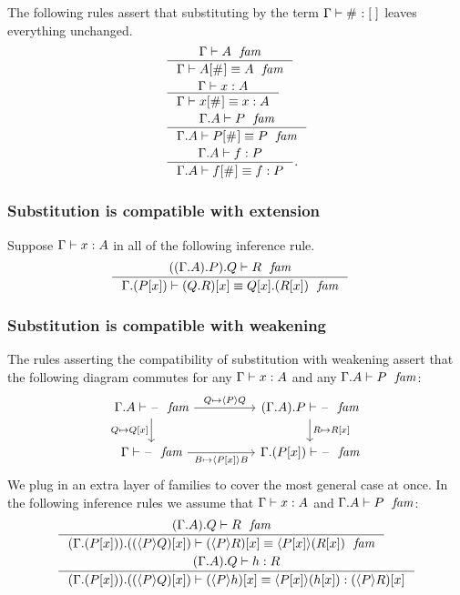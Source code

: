 The following rules assert that substituting by the term $\jterm{\Gamma}{\emptyf}{\emptytm}$
leaves everything unchanged.
\begin{align}
& \inference
  {\jfam{\Gamma}{A}}
  {\jfameq{\Gamma}{\subst{\emptytm}{A}}{A}}\\
& \inference
  {\jterm{\Gamma}{A}{x}}
  {\jtermeq{\Gamma}{A}{\subst{\emptytm}{x}}{x}}\\
& \inference
  {\jfam{{\Gamma}{A}}{P}}
  {\jfameq{{\Gamma}{A}}{\subst{\emptytm}{P}}{P}}\\
& \inference
  {\jterm{{\Gamma}{A}}{P}{f}}
  {\jtermeq{{\Gamma}{A}}{P}{\subst{\emptytm}{f}}{f}}.
\end{align}

\subsubsection{Substitution is compatible with extension}\label{comp-se}
Suppose $\jterm{\Gamma}{A}{x}$ in all of the following inference rule.
\begin{align}
& \inference
  {\jfam{{{{\Gamma}{A}}{P}}{Q}}{R}}
  {\jfameq{{\Gamma}{\subst{x}{P}}}{\subst{x}{\ctxext{Q}{R}}}{\ctxext{\subst{x}{Q}}{\subst{x}{R}}}}
\end{align}

\subsubsection{Substitution is compatible with weakening}\label{comp-sw}
The rules asserting the compatibility of substitution with weakening assert
that the following diagram commutes for any $\jterm{\Gamma}{A}{x}$ and any
$\jfam{{\Gamma}{A}}{P}$:
\begin{equation*}
\begin{tikzcd}[column sep=huge]
\jfam{{\Gamma}{A}}{\blank} \ar{d}[swap]{Q\mapsto\subst{x}{Q}} \ar{r}{Q\mapsto\ctxwk{P}{Q}} & \jfam{{{\Gamma}{A}}{P}}{\blank} \ar{d}{R\mapsto\subst{x}{R}}\\ 
\jfam{\Gamma}{\blank} \ar{r}[swap]{B\mapsto\ctxwk{\subst{x}{P}}{B}} & \jfam{{\Gamma}{\subst{x}{P}}}{\blank}
\end{tikzcd}
\end{equation*}
We plug in an extra layer of families to cover the most general case at once.
In the following inference rules we assume that $\jterm{\Gamma}{A}{x}$ and
$\jfam{{\Gamma}{A}}{P}$:
\begin{align}
& \inference
  {\jfam{{{\Gamma}{A}}{Q}}{R}}
  {\jfameq{{{\Gamma}{\subst{x}{P}}}{\subst{x}{\ctxwk{P}{Q}}}}{\subst{x}{\ctxwk{P}{R}}}{\ctxwk{\subst{x}{P}}{\subst{x}{R}}}}
  \label{comp-sw-f}\\
& \inference
  {\jterm{{{\Gamma}{A}}{Q}}{R}{h}}
  {\jtermeq
      {\ctxext{{\Gamma}{\subst{x}{P}}}{\subst{x}{\ctxwk{P}{Q}}}}
      {\subst{x}{\ctxwk{P}{R}}}
      {\subst{x}{\ctxwk{P}{h}}}
      {\ctxwk{\subst{x}{P}}{\subst{x}{h}}}}
  \label{comp-sw-t}
\end{align}

